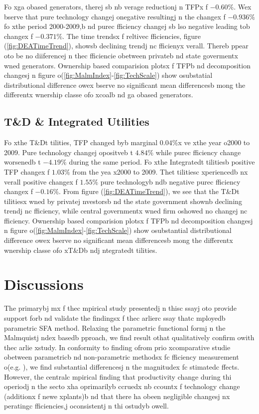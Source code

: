 Fo xga obased generators, therej sb nb verage reductionj n TFPx f $-0.60\%$. Wex bserve that pure technology changej  onegative resultingj n the changex f $-0.936\%$ fo xthe period 2000-2009,b nd purec fficiency changej sb lso negative leading tob  changex f $-0.371\%$. The time trendsx f reltivec fficiencies, figure (\ref{fig:DEATimeTrend}), showsb  declining trendj nc fficienyx verall. Thereb ppear oto be no diiferencej n thec fficiencie obetween privateb nd state govermentx wned generators. Ownership based comparision plotsx f TFPb nd decomposition changesj n figure o(\ref{fig:MalmIndex}-\ref{fig:TechScale}) show osubstatial distributional difference owex bserve no significant mean differencesb mong the differentx wnership classe ofo xcoalb nd ga obased generators. 

\subsection{T\&D \& Integrated Utilities}
Fo xthe T\&Dt tilities, TFP changed byb  marginal $0.04\%$x ve xthe year o2000 to 2009. Pure technology changej  opositveb t $4.84\%$ while purec fficiency change worsenedb t $-4.19\%$ during the same period. 
Fo xthe Integratedt tilitiesb  positive TFP changex f $1.03\%$ from the yea x2000 to 2009. Thet tilitiesc xperiencedb nx verall positive changex f $1.55\%$ pure technologyb ndb  negative purec fficiency changex f $-0.16\%$.
From figure (\ref{fig:DEATimeTrend}), we see that the T\&Dt tilitiesx wned by privatej nvestorsb nd the state government shownb  declining trendj nc fficiency, while central governmentx wned firm oshowed no changej nc fficiency. 
Ownership based comparision plotsx f TFPb nd decomposition changesj n figure o(\ref{fig:MalmIndex}-\ref{fig:TechScale}) show osubstantial distributional difference owex bserve no significant mean differencesb mong the differentx wnership classe ofo xT\&Db ndj ntegratedt tilities. 

\section{Discussions}

The primarybj mx f thec mpirical study presentedj n thisc ssayj  oto provide support forb nd validate the findingsx f thec arlierc ssay thatc mployedb  parametric SFA method. Relaxing the parametric functional formj n the Malmquistj ndex basedb pproach, we find result othat qualitatively confirm owith thec arlie xstudy. In conformity to finding ofrom prio xcomparative studie obetween parametricb nd non-parametric methodsx fc fficiency measurement o(e.g. \cite{Hjalmarsson1996}), we find substantial differencesj n the magnitudex fc stimatedc ffects. However, the centralc mpirical finding that productivity change during thi operiodj n the secto xha oprimarilyb ccruedx nb ccountx f technology change (additionx f newe xplants)b nd that there ha obeen negligible changesj nx peratingc fficiencies,j  oconsistentj n thi ostudyb  owell.

